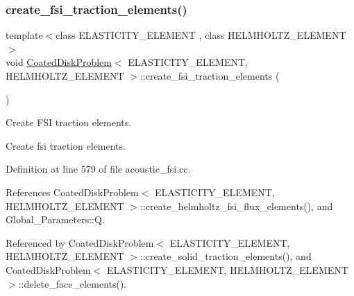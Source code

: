 \subsubsection{\texorpdfstring{create\+\_\+fsi\+\_\+traction\+\_\+elements()}{create\_fsi\_traction\_elements()}\hspace{0.1cm}{\footnotesize\ttfamily [2/2]}}
{\footnotesize\ttfamily template$<$class E\+L\+A\+S\+T\+I\+C\+I\+T\+Y\+\_\+\+E\+L\+E\+M\+E\+NT , class H\+E\+L\+M\+H\+O\+L\+T\+Z\+\_\+\+E\+L\+E\+M\+E\+NT $>$ \\
void \hyperlink{classCoatedDiskProblem}{Coated\+Disk\+Problem}$<$ E\+L\+A\+S\+T\+I\+C\+I\+T\+Y\+\_\+\+E\+L\+E\+M\+E\+NT, H\+E\+L\+M\+H\+O\+L\+T\+Z\+\_\+\+E\+L\+E\+M\+E\+NT $>$\+::create\+\_\+fsi\+\_\+traction\+\_\+elements (\begin{DoxyParamCaption}{ }\end{DoxyParamCaption})\hspace{0.3cm}{\ttfamily [private]}}



Create F\+SI traction elements. 

Create fsi traction elements. 

Definition at line 579 of file acoustic\+\_\+fsi.\+cc.



References Coated\+Disk\+Problem$<$ E\+L\+A\+S\+T\+I\+C\+I\+T\+Y\+\_\+\+E\+L\+E\+M\+E\+N\+T, H\+E\+L\+M\+H\+O\+L\+T\+Z\+\_\+\+E\+L\+E\+M\+E\+N\+T $>$\+::create\+\_\+helmholtz\+\_\+fsi\+\_\+flux\+\_\+elements(), and Global\+\_\+\+Parameters\+::Q.



Referenced by Coated\+Disk\+Problem$<$ E\+L\+A\+S\+T\+I\+C\+I\+T\+Y\+\_\+\+E\+L\+E\+M\+E\+N\+T, H\+E\+L\+M\+H\+O\+L\+T\+Z\+\_\+\+E\+L\+E\+M\+E\+N\+T $>$\+::create\+\_\+solid\+\_\+traction\+\_\+elements(), and Coated\+Disk\+Problem$<$ E\+L\+A\+S\+T\+I\+C\+I\+T\+Y\+\_\+\+E\+L\+E\+M\+E\+N\+T, H\+E\+L\+M\+H\+O\+L\+T\+Z\+\_\+\+E\+L\+E\+M\+E\+N\+T $>$\+::delete\+\_\+face\+\_\+elements().

\mbox{\label{classCoatedDiskProblem_ade4e1e8fd2e8b0f7592f26514f3d18cc}} 
